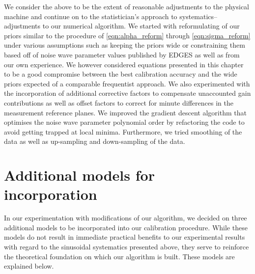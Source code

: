 We consider the above to be the extent of reasonable adjustments to the physical machine and continue on to the statistician’s approach to systematics--adjustments to our numerical algorithm. We started with reformulating of our priors similar to the procedure of \cref{eqn:alpha_reform} through \cref{eqn:sigma_reform} under various assumptions such as keeping the priors wide or constraining them based off of noise wave parameter values published by EDGES as well as from our own experience. We however considered equations presented in this chapter to be a good compromise between the best calibration accuracy and the wide priors expected of a comparable frequentist approach. We also experimented with the incorporation of additional corrective factors to compensate unaccounted gain contributions as well as offset factors to correct for minute differences in the measurement reference planes. We improved the gradient descent algorithm that optimises the noise wave parameter polynomial order by refactoring the code to avoid getting trapped at local minima. Furthermore, we tried smoothing of the data as well as up-sampling and down-sampling of the data.

\section{Additional models for incorporation}
In our experimentation with modifications of our algorithm, we decided on three additional models to be incorporated into our calibration procedure. While these models do not result in immediate practical benefits to our experimental results with regard to the sinusoidal systematics presented above, they serve to reinforce the theoretical foundation on which our algorithm is built. These models are explained below.